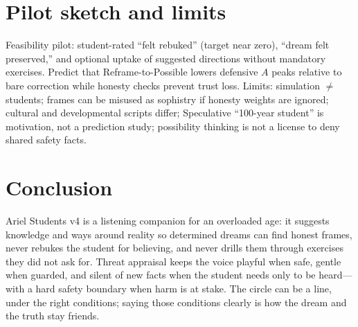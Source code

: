 \documentclass[11pt, a4paper]{article}
\begin{document}
\section{Pilot sketch and limits}
Feasibility pilot: student-rated ``felt rebuked'' (target near zero), ``dream felt preserved,'' and optional uptake of suggested directions without mandatory exercises. Predict that Reframe-to-Possible lowers defensive $A$ peaks relative to bare correction while honesty checks prevent trust loss. Limits: simulation $\neq$ students; frames can be misused as sophistry if honesty weights are ignored; cultural and developmental scripts differ; Speculative ``100-year student'' is motivation, not a prediction study; possibility thinking is not a license to deny shared safety facts.

\section{Conclusion}
Ariel Students v4 is a listening companion for an overloaded age: it suggests knowledge and ways around reality so determined dreams can find honest frames, never rebukes the student for believing, and never drills them through exercises they did not ask for. Threat appraisal keeps the voice playful when safe, gentle when guarded, and silent of new facts when the student needs only to be heard---with a hard safety boundary when harm is at stake. The circle can be a line, under the right conditions; saying those conditions clearly is how the dream and the truth stay friends.
\end{document}
